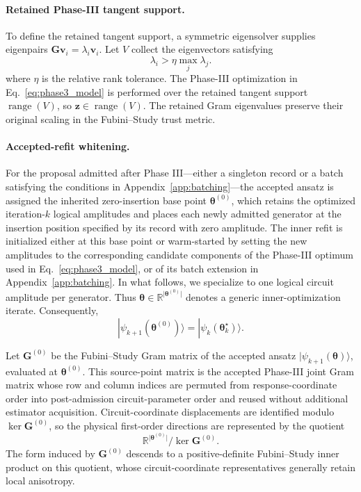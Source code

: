 \documentclass[
  reprint,
  amsmath,
  amssymb,
  aps,
  pra,
  nofootinbib,
  superscriptaddress,
  floatfix
]{revtex4-2}
\newcommand{\ket}[1]{|#1\rangle}
\begin{document}
\paragraph*{Retained Phase-III tangent support.}
%
To define the retained tangent support, a symmetric eigensolver supplies
eigenpairs \(\mathbf G\mathbf v_i=\lambda_i\mathbf v_i\). Let \(V\) collect
the eigenvectors satisfying
\begin{equation}
\lambda_i>\eta\max_j\lambda_j.
\label{eq:phase3_support_threshold}
\end{equation}
where \(\eta\) is the relative rank tolerance. The Phase-III optimization in
Eq.~\eqref{eq:phase3_model} is performed over the retained tangent support
\(\operatorname{range}(V)\), so
\(\mathbf z\in\operatorname{range}(V)\). The retained Gram eigenvalues
preserve their original scaling in the Fubini--Study trust metric.

\paragraph*{Accepted-refit whitening.}
For the proposal admitted after Phase III---either a singleton record or a
batch satisfying the conditions in Appendix~\ref{app:batching}---the accepted
ansatz is assigned the inherited zero-insertion base point
\(\boldsymbol\theta^{(0)}\), which retains the optimized iteration-\(k\)
logical amplitudes and places each newly admitted generator at the insertion
position specified by its record with zero amplitude. The inner refit is
initialized either at this base point or warm-started by setting the new
amplitudes to the corresponding candidate components of the Phase-III optimum
used in Eq.~\eqref{eq:phase3_model}, or of its batch extension in
Appendix~\ref{app:batching}. In what follows, we specialize to one logical
circuit amplitude per generator.
Thus
\(\boldsymbol\theta\in
\mathbb R^{\lvert\boldsymbol\theta^{(0)}\rvert}\)
denotes a generic inner-optimization iterate. Consequently,
\[
\ket{\psi_{k+1}(\boldsymbol\theta^{(0)})}
=
\ket{\psi_k(\boldsymbol\theta_k^\star)}.
\]

Let \(\mathbf G^{(0)}\) be the Fubini--Study Gram matrix of the accepted
ansatz \(\ket{\psi_{k+1}(\boldsymbol\theta)}\), evaluated at
\(\boldsymbol\theta^{(0)}\). This source-point matrix is the accepted
Phase-III joint Gram matrix whose row and column indices are permuted from
response-coordinate order into post-admission circuit-parameter order and
reused without additional estimator acquisition. Circuit-coordinate
displacements are identified modulo
\(\ker\mathbf G^{(0)}\), so the physical first-order directions are
represented by the quotient
\begin{equation}
\mathbb R^{\lvert\boldsymbol\theta^{(0)}\rvert}
\big/
\ker\mathbf G^{(0)}.
\label{eq:accepted_refit_quotient}
\end{equation}
The form induced by \(\mathbf G^{(0)}\) descends to a positive-definite
Fubini--Study inner product on this quotient, whose circuit-coordinate
representatives generally retain local anisotropy.
\end{document}
